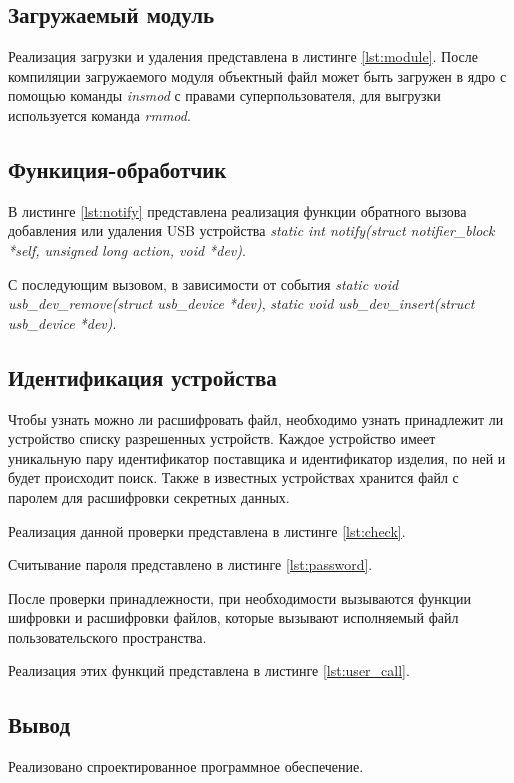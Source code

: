 \documentclass[a4paper, 10pt]{article}
\begin{document}
	\subsection{Загружаемый модуль}
	Реализация загрузки и удаления представлена в листинге \ref{lst:module}.
	После компиляции загружаемого модуля объектный файл может быть загружен в ядро с помощью команды \textit{insmod} с правами суперпользователя, для выгрузки используется команда \textit{rmmod}.
	\subsection{Функиция-обработчик}
	\hspace*{5mm}В листинге \ref{lst:notify} представлена реализация функции обратного вызова добавления или удаления USB устройства \textit{static int notify(struct notifier\_block *self, unsigned long action, void *dev)}. 
	
	С последующим вызовом, в зависимости от события \textit{static void usb\_dev\_remove(struct usb\_device *dev)}, \textit{static void usb\_dev\_insert(struct usb\_device *dev)}.
	\subsection{Идентификация устройства}
	\hspace*{5mm}Чтобы узнать можно ли расшифровать файл, необходимо узнать принадлежит ли устройство списку разрешенных устройств. Каждое устройство имеет уникальную пару идентификатор поставщика и идентификатор изделия, по ней и будет происходит поиск. Также в известных устройствах хранится файл с паролем для расшифровки секретных данных.
	
	Реализация данной проверки представлена в листинге \ref{lst:check}.
	
	Считывание пароля представлено в листинге \ref{lst:password}.
	
	После проверки принадлежности, при необходимости вызываются функции шифровки и расшифровки файлов, которые вызывают исполняемый файл пользовательского пространства.
	
	Реализация этих функций представлена в листинге \ref{lst:user_call}.
	
	\subsection{Вывод}
	\hspace*{5mm}Реализовано спроектированное программное обеспечение.
	
\end{document}
